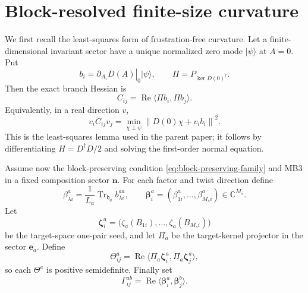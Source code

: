 \documentclass[11pt]{article}
\numberwithin{equation}{section}
\newcommand{\bn}{\mathbf n}
\newcommand{\be}{\mathbf e}
\newcommand{\bbeta}{\boldsymbol\beta}
\newcommand{\bzeta}{\boldsymbol\zeta}
\newcommand{\Tr}{\operatorname{Tr}}
\newcommand{\Ree}{\operatorname{Re}}
\begin{document}
\section{Block-resolved finite-size curvature}

We first recall the least-squares form of frustration-free curvature.  Let a finite-dimensional invariant sector have a unique normalized zero mode $|\psi\rangle$ at $A=0$.  Put
\begin{equation}
 b_i=\left.\partial_{A_i}D(A)\right|_0|\psi\rangle,
 \qquad
 \Pi=P_{\ker D(0)^\dagger}.
 \label{eq:LS-data}
\end{equation}
Then the exact branch Hessian is
\begin{equation}
 C_{ij}=\Ree\langle\Pi b_i,\Pi b_j\rangle.
 \label{eq:LS}
\end{equation}
Equivalently, in a real direction $v$,
\begin{equation}
 v_iC_{ij}v_j
 =\min_{\chi\perp\psi}
 \left\|D(0)\chi+v_i b_i\right\|^2.
 \label{eq:LS-min}
\end{equation}
This is the least-squares lemma used in the parent paper; it follows by differentiating $H=D^\dagger D/2$ and solving the first-order normal equation.

Assume now the block-preserving condition \eqref{eq:block-preserving-family} and MB3 in a fixed composition sector $\bn$.  For each factor and twist direction define
\begin{equation}
 \beta_{\lambda i}^a
 =\frac1{L_a}\Tr_{\mathfrak h_a}b_{\lambda i}^{aa},
 \qquad
 \bbeta_i^a=(\beta_{1i}^a,\ldots,\beta_{M_s i}^a)\in\mathbb C^{M_s}.
 \label{eq:beta-vector}
\end{equation}
Let
\begin{equation}
 \bzeta_i^a
 =\bigl(\zeta_a(B_{1i}),\ldots,\zeta_a(B_{M_si})\bigr)
 \label{eq:zeta-vector}
\end{equation}
be the target-space one-pair seed, and let $\Pi_a$ be the target-kernel projector in the sector $\be_a$.  Define
\begin{equation}
 \Theta_{ij}^a
 =\Ree\langle\Pi_a\bzeta_i^a,\Pi_a\bzeta_j^a\rangle,
 \label{eq:Theta}
\end{equation}
so each $\Theta^a$ is positive semidefinite.  Finally set
\begin{equation}
 \Gamma_{ij}^{ab}
 =\Ree\langle\bbeta_i^a,\bbeta_j^b\rangle.
 \label{eq:Gamma-ab}
\end{equation}
\end{document}
